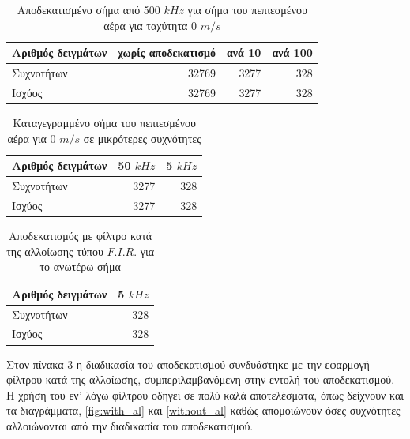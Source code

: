 \documentclass[breaklines=true, 12pt]{article}
\begin{document}
{{{\begin{table}[htbp]
\caption{\label{some_ref}Αποδεκατισμένο σήμα από 500 \(kHz\) για σήμα του πεπιεσμένου αέρα για ταχύτητα 0 \(m/s\)}
\centering
\begin{tabular}{lrrr}
\hline
Αριθμός δειγμάτων & χωρίς αποδεκατισμό & ανά 10 & ανά 100\\[0pt]
\hline
Συχνοτήτων & 32769 & 3277 & 328\\[0pt]
Ισχύος & 32769 & 3277 & 328\\[0pt]
\end{tabular}
\end{table}

\begin{table}[htbp]
\caption{\label{rec_low_fs_ref}Καταγεγραμμένο σήμα του πεπιεσμένου αέρα για 0 \(m/s\) σε μικρότερες συχνότητες}
\centering
\begin{tabular}{lrr}
Αριθμός δειγμάτων & 50 \(kHz\) & 5 \(kHz\)\\[0pt]
\hline
Συχνοτήτων & 3277 & 328\\[0pt]
Ισχύος & 3277 & 328\\[0pt]
\end{tabular}
\end{table}

\begin{table}[htbp]
\caption{\label{dec_fir_ref}Αποδεκατισμός με φίλτρο κατά της αλλοίωσης τύπου \(F.I.R.\) για το ανωτέρω σήμα}
\centering
\begin{tabular}{lr}
Αριθμός δειγμάτων & 5 \(kHz\)\\[0pt]
\hline
\hline
Συχνοτήτων & 328\\[0pt]
Ισχύος & 328\\[0pt]
\end{tabular}
\end{table}

Στον πίνακα \ref{dec_fir_ref} η διαδικασία του αποδεκατισμού συνδυάστηκε με
την εφαρμογή φίλτρου κατά της αλλοίωσης, συμπεριλαμβανόμενη στην εντολή
του αποδεκατισμού. Η χρήση του εν' λόγω φίλτρου οδηγεί σε πολύ καλά αποτελέσματα,
όπως δείχνουν και τα διαγράμματα, \ref{fig:with_al} και \ref{without_al} καθώς απομοιώνουν
όσες συχνότητες αλλοιώνονται από την διαδικασία του αποδεκατισμού.

}}}
\end{document}
